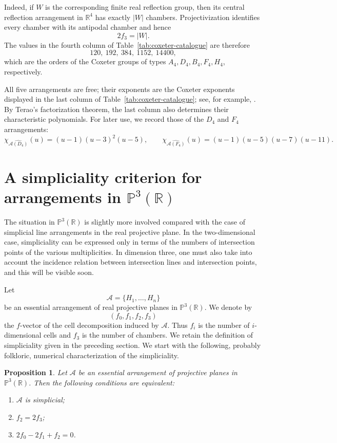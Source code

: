\documentclass[11pt]{article}
\newtheorem{proposition}[theorem]{Proposition}
\theoremstyle{definition}
\theoremstyle{remark}
\newcommand{\PP}{\mathbb P}
\newcommand{\RR}{\mathbb R}
\newcommand{\cA}{\mathcal A}
\begin{document}
Indeed, if $W$ is the corresponding finite real reflection group, then its
central reflection arrangement in $\RR^4$ has exactly $|W|$ chambers.
Projectivization identifies every chamber with its antipodal chamber and hence
\[
2f_3=|W|.
\]
The values in the fourth column of Table~\ref{tab:coxeter-catalogue} are
therefore
\[
120,\ 192,\ 384,\ 1152,\ 14400,
\]
which are the orders of the Coxeter groups of types
$A_4,D_4,B_4,F_4,H_4$, respectively.

All five arrangements are free; their exponents are the Coxeter
exponents displayed in the last column of
Table~\ref{tab:coxeter-catalogue}; see, for example, \cite{OrlikTerao}. By Terao's factorization theorem, the last column also determines their characteristic polynomials.  For later use, we record those of the $D_4$ and
$F_4$ arrangements:
\[
 \chi_{\widehat{\cA(D_4)}}(u)=(u-1)(u-3)^2(u-5),
 \qquad
 \chi_{\widehat{\cA(F_4)}}(u)=(u-1)(u-5)(u-7)(u-11).
\]

\section{A simpliciality criterion for arrangements in \texorpdfstring{$\PP^3(\RR)$}{P3(R)}}
\label{sec:simplicial-RP3}
The situation in $\PP^3(\RR)$ is slightly more involved compared with the case of simplicial line arrangements in the real projective plane. In the
two-dimensional case, simpliciality can be expressed only in terms of
the numbers of intersection points of the various multiplicities. In
dimension three, one must also take into account the incidence relation
between intersection lines and intersection points, and this will be visible soon. 

Let
\[
\cA=\{H_1,\ldots,H_n\}
\]
be an essential arrangement of real projective planes in $\PP^3(\RR)$.
We denote by
\[
(f_0,f_1,f_2,f_3)
\]
the $f$-vector of the cell decomposition induced by $\cA$. Thus $f_i$ is
the number of $i$-dimensional cells and $f_3$ is the number of chambers.
We retain the definition of simpliciality given in the preceding section. We start with the following, probably folkloric, numerical characterization of the simpliciality.

\begin{proposition}
\label{prop:face-simpliciality-RP3}
Let $\cA$ be an essential arrangement of projective planes in
$\PP^3(\RR)$. Then the following conditions are equivalent:
\begin{enumerate}
    \item $\cA$ is simplicial;
    \item $f_2=2f_3$;
    \item $2f_0-2f_1+f_2=0$.
\end{enumerate}
\end{proposition}
\end{document}
